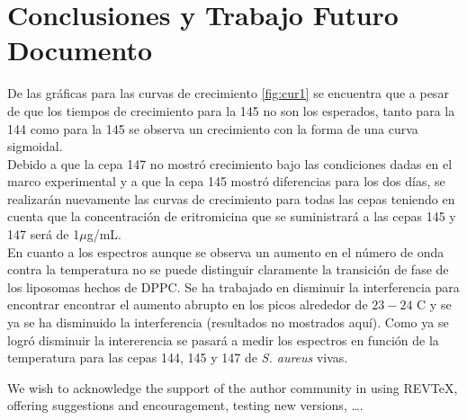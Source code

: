 \documentclass[%
 reprint,
 amsmath,amssymb,
 aps,
]{revtex4-2}
\begin{document}
\section{Conclusiones y Trabajo Futuro Documento}
De las gr\'{a}ficas para las curvas de crecimiento \ref{fig:cur1} se encuentra que a pesar de que los tiempos de crecimiento para la 145 no son los esperados, tanto para la 144 como para la 145 se observa un crecimiento con la forma de una curva sigmoidal.\\
Debido a que la cepa 147 no mostr\'{o} crecimiento bajo las condiciones dadas en el marco experimental y a que la cepa 145 mostr\'{o} diferencias para los dos d\'{i}as, se realizar\'{a}n nuevamente las curvas de crecimiento para todas las cepas teniendo en cuenta que la concentraci\'{o}n de eritromicina que se suministrar\'{a} a las cepas 145 y 147 ser\'{a} de 1$\mu$g/mL.\\
En cuanto a los espectros aunque se observa un aumento en el n\'{u}mero de onda contra la temperatura no se puede distinguir claramente la transici\'{o}n de fase de los liposomas hechos de DPPC. Se ha trabajado en disminuir la interferencia para encontrar encontrar el aumento abrupto en los picos alrededor de $23-24$ \textdegree C y se ya se ha disminuido la interferencia (resultados no mostrados aqu\'{i}). Como ya se logr\'{o} disminuir la intererencia se pasar\'{a} a medir los espectros en funci\'{o}n de la temperatura para las cepas 144, 145 y 147 de \textit{S. aureus} vivas.\\

\begin{acknowledgments}
We wish to acknowledge the support of the author community in using
REV\TeX{}, offering suggestions and encouragement, testing new versions,
\dots.
\end{acknowledgments}

\appendix
\end{document}
